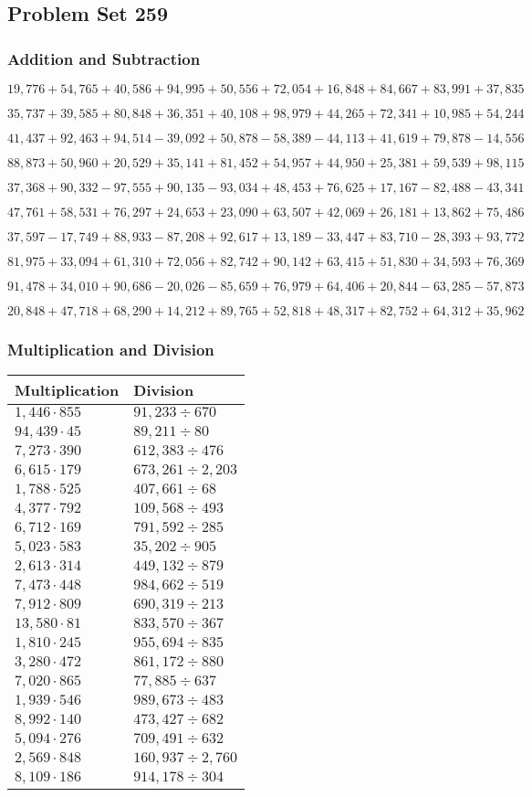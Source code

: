 \hypertarget{problem-set-259}{%
\subsection{Problem Set 259}\label{problem-set-259}}

\hypertarget{addition-and-subtraction}{%
\subsubsection{Addition and
Subtraction}\label{addition-and-subtraction}}

\(19,776+54,765+40,586+94,995+50,556+72,054+16,848+84,667+83,991+37,835\)

\(35,737+39,585+80,848+36,351+40,108+98,979+44,265+72,341+10,985+54,244\)

\(41,437+92,463+94,514-39,092+50,878-58,389-44,113+41,619+79,878-14,556\)

\(88,873+50,960+20,529+35,141+81,452+54,957+44,950+25,381+59,539+98,115\)

\(37,368+90,332-97,555+90,135-93,034+48,453+76,625+17,167-82,488-43,341\)

\(47,761+58,531+76,297+24,653+23,090+63,507+42,069+26,181+13,862+75,486\)

\(37,597-17,749+88,933-87,208+92,617+13,189-33,447+83,710-28,393+93,772\)

\(81,975+33,094+61,310+72,056+82,742+90,142+63,415+51,830+34,593+76,369\)

\(91,478+34,010+90,686-20,026-85,659+76,979+64,406+20,844-63,285-57,873\)

\(20,848+47,718+68,290+14,212+89,765+52,818+48,317+82,752+64,312+35,962\)

\hypertarget{multiplication-and-division}{%
\subsubsection{Multiplication and
Division}\label{multiplication-and-division}}

\begin{longtable}[]{@{}ll@{}}
\toprule
Multiplication & Division\tabularnewline
\midrule
\endhead
\(1,446\cdot855\) & \(91,233÷670\)\tabularnewline
\(94,439\cdot45\) & \(89,211÷80\)\tabularnewline
\(7,273\cdot390\) & \(612,383÷476\)\tabularnewline
\(6,615\cdot179\) & \(673,261÷2,203\)\tabularnewline
\(1,788\cdot525\) & \(407,661÷68\)\tabularnewline
\(4,377\cdot792\) & \(109,568÷493\)\tabularnewline
\(6,712\cdot169\) & \(791,592÷285\)\tabularnewline
\(5,023\cdot583\) & \(35,202÷905\)\tabularnewline
\(2,613\cdot314\) & \(449,132÷879\)\tabularnewline
\(7,473\cdot448\) & \(984,662÷519\)\tabularnewline
\(7,912\cdot809\) & \(690,319÷213\)\tabularnewline
\(13,580\cdot81\) & \(833,570÷367\)\tabularnewline
\(1,810\cdot245\) & \(955,694÷835\)\tabularnewline
\(3,280\cdot472\) & \(861,172÷880\)\tabularnewline
\(7,020\cdot865\) & \(77,885÷637\)\tabularnewline
\(1,939\cdot546\) & \(989,673÷483\)\tabularnewline
\(8,992\cdot140\) & \(473,427÷682\)\tabularnewline
\(5,094\cdot276\) & \(709,491÷632\)\tabularnewline
\(2,569\cdot848\) & \(160,937÷2,760\)\tabularnewline
\(8,109\cdot186\) & \(914,178÷304\)\tabularnewline
\bottomrule
\end{longtable}
